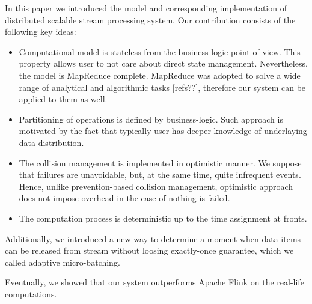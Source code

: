 
\label {fs-conclusion-tection}

In this paper we introduced the model and corresponding implementation of distributed scalable stream processing system. Our contribution consists of the following key ideas:

\begin{itemize}
    \item Computational model is stateless from the business-logic point of view. This property allows user to not care about direct state management. Nevertheless,
 the model is MapReduce complete. MapReduce was adopted to solve a wide range of analytical and algorithmic tasks [refs??], therefore our system can be applied to them as well.
    \item Partitioning of operations is defined by business-logic. Such approach is motivated by the fact that typically user has deeper knowledge of underlaying data distribution.
    \item The collision management is implemented in optimistic manner. We suppose that failures are unavoidable, but, at the same time, quite infrequent events. Hence, unlike prevention-based collision management, optimistic approach does not impose overhead in the case of nothing is failed.
    \item The computation process is deterministic up to the time assignment at fronts.     
\end{itemize}

Additionally, we introduced a new way to determine a moment when data items can be released from stream without loosing exactly-once guarantee, which we called adaptive micro-batching.

Eventually, we showed that our system outperforms Apache Flink on the real-life computations.









